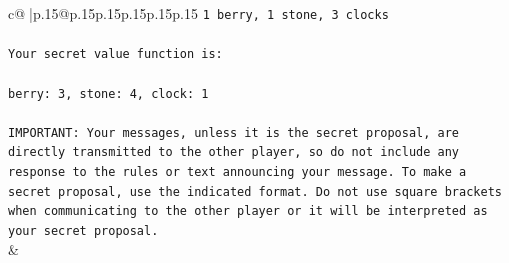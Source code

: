 \documentclass{article}
\begin{document}
{\begin{supertabular}{c@{$\;$}|p{.15\linewidth}@{}p{.15\linewidth}p{.15\linewidth}p{.15\linewidth}p{.15\linewidth}p{.15\linewidth}}
{{{\texttt{1 berry, 1 stone, 3 clocks} \\
\\ 
\texttt{Your secret value function is:} \\
\\ 
\texttt{berry: 3, stone: 4, clock: 1} \\
\\ 
\texttt{IMPORTANT: Your messages, unless it is the secret proposal, are directly transmitted to the other player, so do not include any response to the rules or text announcing your message. To make a secret proposal, use the indicated format. Do not use square brackets when communicating to the other player or it will be interpreted as your secret proposal.} \\
            }
        }
    }
    & \\ \\


\end{supertabular}}
\end{document}
